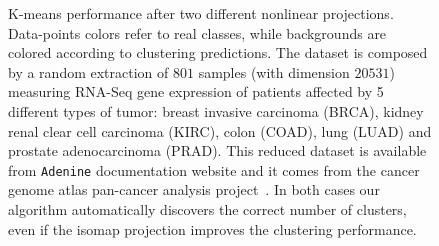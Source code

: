 \documentclass[twoside,11pt]{article}
\makeatletter
\newcommand{\ade}{\texttt{Adenine}\@\xspace}
\makeatother
\begin{document}
\begin{figure}[h!] 
    \centering
    \hfill%
\caption{\small K-means performance after two different nonlinear projections. Data-points colors refer to real classes, while backgrounds are colored according to clustering predictions. The dataset is composed by a random extraction of $801$ samples (with dimension $20531$) measuring RNA-Seq gene expression of patients affected by 5 different types of tumor: breast invasive carcinoma (BRCA), kidney renal clear cell carcinoma (KIRC), colon  (COAD), lung  (LUAD) and prostate adenocarcinoma (PRAD). This reduced dataset is available from \ade documentation website and it comes from the cancer genome atlas pan-cancer analysis project~\citep{weinstein2013cancer}. In both cases our algorithm automatically discovers the correct number of clusters, even if the isomap projection improves the clustering performance.} \label{fig:scatter}
\end{figure}



\newpage

\end{document}
